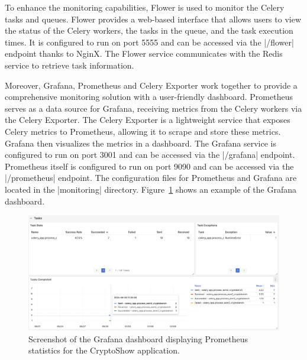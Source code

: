 To enhance the monitoring capabilities, Flower is used to monitor the Celery tasks and queues. Flower provides a web-based interface that allows users to view the status of the Celery workers, the tasks in the queue, and the task execution times. It is configured to run on port 5555 and can be accessed via the \inline|/flower| endpoint thanks to NginX. The Flower service communicates with the Redis service to retrieve task information.

Moreover, Grafana, Prometheus and Celery Exporter work together to provide a comprehensive monitoring solution with a user-friendly dashboard. Prometheus serves as a data source for Grafana, receiving metrics from the Celery workers via the Celery Exporter. The Celery Exporter is a lightweight service that exposes Celery metrics to Prometheus, allowing it to scrape and store these metrics. Grafana then visualizes the metrics in a dashboard. The Grafana service is configured to run on port 3001 and can be accessed via the \inline|/grafana| endpoint. Prometheus itself is configured to run on port 9090 and can be accessed via the \inline|/prometheus| endpoint. The configuration files for Prometheus and Grafana are located in the \inline|monitoring| directory. Figure~\ref{fig:grafana} shows an example of the Grafana dashboard.

\begin{figure}[htpb]
    \centering
    \includegraphics[width=\textwidth]{img/grafana.png}
    \caption{Screenshot of the Grafana dashboard displaying Prometheus statistics for the CryptoShow application.}
    \label{fig:grafana}
\end{figure}

